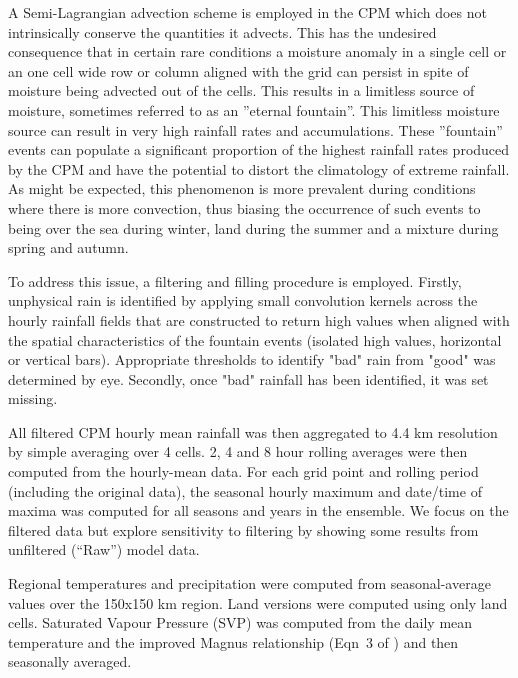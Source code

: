 \documentclass[11pt,a4paper]{article}
\begin{document}
A Semi-Lagrangian advection scheme is employed in the CPM which does not intrinsically conserve the quantities it advects. This has the undesired consequence that in certain rare conditions a moisture anomaly in a single cell or  an one cell wide row or column aligned with the grid can persist in spite of moisture being advected out of the cells. This results in a limitless source of moisture, sometimes referred to as an ''eternal fountain''.  This limitless moisture source can result in very high rainfall rates and accumulations.  These ''fountain'' events can populate a significant proportion of the highest rainfall rates produced by the CPM and have the potential to distort the climatology of extreme rainfall.  As might be expected, this phenomenon is more prevalent during conditions where there is more convection, thus biasing the occurrence of such events to being over the sea during winter, land during the summer and a mixture during spring and autumn.

To address this issue, a filtering and filling procedure is employed.  Firstly, unphysical rain is identified by applying small convolution kernels across the hourly rainfall fields that are constructed to return high values when aligned with the spatial characteristics of the fountain events (isolated high values, horizontal or vertical bars).  Appropriate thresholds to identify "bad" rain from "good" was determined by eye.  Secondly, once "bad" rainfall has been identified, it was set missing. 

All filtered CPM hourly mean rainfall was then aggregated to 4.4 km resolution by simple averaging over 4 cells.  2, 4  and 8 hour rolling averages were then computed from the hourly-mean data. For each grid point and rolling period (including the original data),  the seasonal hourly maximum and date/time of maxima was computed for all seasons and years in the ensemble. We focus on the filtered data but  explore sensitivity to filtering by showing some results from unfiltered (``Raw'') model data.

Regional temperatures and precipitation were computed from seasonal-average values over the 150x150 km region. Land versions were computed using only land cells. Saturated Vapour Pressure (SVP) was computed from the daily mean temperature and the improved Magnus relationship (Eqn~3 of \cite{Huang2018SVP}) and then seasonally averaged.
\end{document}
